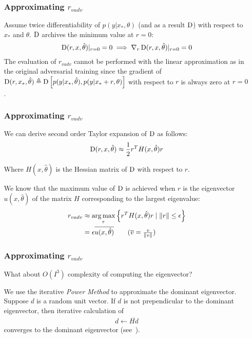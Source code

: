 \begin{frame}
\frametitle{Approximating \(r_{vadv}\)}
Assume twice differentiability of \(p(y|x_*, \theta)\) (and as a result \(\operatorname*{D}\)) with respect to \(x_*\) and \(\theta\).
\(\operatorname*{D}\) archives the minimum value at \(r = 0\):
\begin{align*}
\operatorname*{D}(r, x, \hat{\theta})|_{r=0} = 0 \implies \nabla_r \operatorname*{D}(r, x, \hat{\theta})|_{r=0} = 0
\end{align*}
\pause
The evaluation of \(r_{vadv}\) cannot be performed with the linear approximation as in the original adversarial training since the gradient of \(\operatorname*{D}(r, x_*, \hat{\theta}) \triangleq\operatorname*{D} \left[p(y | x_*, \hat{\theta}), p(y | x_* + r, \theta)\right]\) with respect to \(r\) is always zero at \(r = 0\).
\end{frame}

\begin{frame}
\frametitle{Approximating \(r_{vadv}\)}
We can derive second order Taylor expansion of \(\operatorname*{D}\) as follows:
\begin{align*}
\operatorname*{D}(r, x, \hat{\theta}) \approx \frac{1}{2} r^T H(x, \hat{\theta})r
\end{align*}

Where \(H(x, \hat{\theta})\) is the Hessian matrix of \(\operatorname*{D}\) with respect to \(r\).\\

\pause

We know that the maximum value of \(\operatorname*{D}\) is achieved when \(r\) is the eigenvector \(u(x, \hat{\theta})\) of the matrix \(H\) corresponding to the largest eigenvalue:
\begin{align*}
r_{vadv} &\approx \argmax_r\left\{r^T H(x, \hat{\theta})r \mid \norm{r} \le \epsilon\right\}\\
&= \epsilon \overline{u(x, \hat{\theta})} \tag{\(\overline{v} = \frac{v}{\norm{v}}\)}
\end{align*}
\end{frame}

\begin{frame}
    \frametitle{Approximating \(r_{vadv}\)}
What about \(O(I^3)\) complexity of computing the eigenvector?

\pause
We use the iterative \textit{Power Method} to approximate the dominant eigenvector.
Suppose \(d\) is a random unit vector. If \(d\) is not prependicular to the dominant eigenvector, then iterative calculation of
\begin{align*}
d \leftarrow \overline{Hd}
\end{align*}
converges to the dominant eigenvector (see~).
\end{frame}


